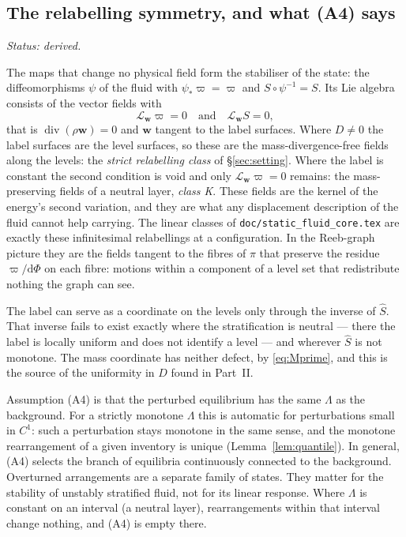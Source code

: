 \documentclass[11pt]{article}
\theoremstyle{definition}
\theoremstyle{remark}
\newcommand{\bw}{\mathbf{w}}
\newcommand{\Div}{\operatorname{div}}
\newcommand{\code}[1]{\texttt{#1}}
\newcommand{\status}[1]{\noindent\emph{Status: #1}\par\smallskip}
\begin{document}
\subsection{The relabelling symmetry, and what (A4) says}
\label{sec:A4}

\status{derived.}

The maps that change no physical field form the stabiliser of the
state: the diffeomorphisms $\psi$ of the fluid with $\psi_*\varpi =
\varpi$ and $S\circ\psi^{-1} = S$. Its Lie algebra consists of the
vector fields with
\begin{equation}
  \mathcal L_{\bw}\varpi = 0\quad\text{and}\quad\mathcal L_{\bw}S = 0 ,
  \label{eq:gauge}
\end{equation}
that is $\Div(\rho\bw) = 0$ and $\bw$ tangent to the label surfaces.
Where $D \ne 0$ the label surfaces are the level surfaces, so these
are the mass-divergence-free fields along the levels: the \emph{strict
relabelling class} of \S\ref{sec:setting}. Where the label is constant
the second condition is void and only $\mathcal L_{\bw}\varpi = 0$
remains: the mass-preserving fields of a neutral layer, \emph{class K}.
These fields are the kernel of the energy's second variation, and they
are what any displacement description of the fluid cannot help
carrying. The linear classes of \code{doc/static\_fluid\_core.tex} are
exactly these infinitesimal relabellings at a configuration. In the
Reeb-graph picture they are the fields tangent to the fibres of $\pi$
that preserve the residue $\varpi/\mathrm d\Phi$ on each fibre: motions
within a component of a level set that redistribute nothing the graph
can see.

The label can serve as a coordinate on the
levels only through the inverse of $\hat S$. That inverse fails to exist
exactly where the stratification is neutral --- there the label is
locally uniform and does not identify a level --- and wherever $\hat S$
is not monotone. The mass coordinate has neither defect, by
\eqref{eq:Mprime}, and this is the source of the uniformity in $D$
found in Part~II.

Assumption (A4) is that the perturbed equilibrium has the same
$\Lambda$ as the background. For a strictly monotone $\Lambda$ this is
automatic for perturbations small in $C^1$: such a perturbation stays
monotone in the same sense, and the monotone rearrangement of a given
inventory is unique (Lemma~\ref{lem:quantile}). In general, (A4)
selects the branch of equilibria continuously connected to the
background. Overturned arrangements are a separate family of states.
They matter for the stability of unstably stratified fluid, not for
its linear response. Where $\Lambda$ is constant on an interval (a
neutral layer), rearrangements within that interval change nothing,
and (A4) is empty there.
\end{document}

